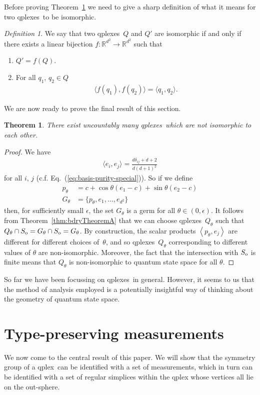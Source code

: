\documentclass[aps,pra,superscriptaddress,10pt,tightenlines,twocolumn,nofootinbib]{revtex4}
\newtheorem{theorem}{Theorem}
\theoremstyle{remark}
\newtheorem{definition}{Definition}
\newcommand{\ea}[1]{\begin{align}#1\end{align}}
\newcommand{\fd}[1]{\mathbb{#1}}
\newcommand{\la}{\langle}
\newcommand{\ra}{\rangle}
\newcommand{\so}{S_{\rm{o}}}
\newcommand{\qp}{Q}
\newcommand{\pr}{G}
\newcommand{\qplex}{qplex}
\newcommand{\qplexes}{qplexes}
\newcommand{\inprod}[2]{{\left\langle #1 , #2 \right\rangle}}
\begin{document}
Before proving Theorem~\ref{thm:infNonIsomorphic} we need to give a sharp definition of what it means for two \qplexes\ to be isomorphic.
\begin{definition}
\label{def:qplexIsomorphism}
We say that two \qplexes\ $\qp$ and $\qp'$ are isomorphic if and only if there exists a linear bijection $f\colon \fd{R}^{d^2} \to \fd{R}^{d^2}$ such that
\begin{enumerate}
\item $\qp'=f(\qp)$.
\item For all $q_1$, $q_2 \in \qp$
\ea{
\la f(q_1),f(q_2) \ra = \la q_1, q_2\ra.
}
\end{enumerate}
\end{definition}

We are now ready to prove the final result of this section.
\begin{theorem}
\label{thm:infNonIsomorphic}
There exist uncountably many \qplexes\ which are not isomorphic to each other.
\end{theorem}
\begin{proof}
We have
\ea{
\la e_i , e_j\ra = \frac{d\delta_{ij} + d + 2}{d(d+1)^2}
}
for all $i$, $j$ (c.f. Eq.~(\ref{eq:basis-purity-special})).  So if we define
\ea{
p_{\theta}& = c + \cos \theta (e_1-c) + \sin \theta (e_2-c)
\\
\pr_{\theta} &= \{p_{\theta} , e_1, \dots, e_{d^2}\}
}
then, for sufficiently small $\epsilon$,  the set $\pr_{\theta}$ is a germ for all $\theta \in (0,\epsilon)$.  It follows from Theorem~\ref{thm:bdryTheoremA} that we can choose \qplexes\ $\qp_{\theta}$ such that $\qp_{\theta} \cap \so = \pr_{\theta} \cap \so = \pr_{\theta}$.  By construction, the scalar products $\inprod{p_{\theta}}{e_j}$ are different for different choices of~$\theta$, and so \qplexes\ $\qp_{\theta}$ corresponding to different values of $\theta$ are non-isomorphic.  Moreover, the fact that the intersection with $\so$ is finite means that $\qp_{\theta}$ is non-isomorphic to quantum state space for all $\theta$.
\end{proof}
So far we have been focussing on  \qplexes\ in general.  However, it seems to us that the method of analysis employed is a potentially insightful way of thinking about the geometry of quantum state space.

\section{Type-preserving measurements}
\label{sec:intg}
We now come to the central result of this paper.   We will show that the symmetry group of a \qplex\ can be identified with a set of measurements, which in turn can be identified with a set of regular simplices within the qplex whose vertices all lie on the out-sphere.
\end{document}
